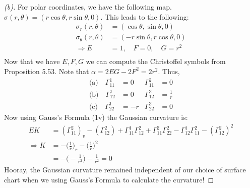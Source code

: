 \documentclass[a4paper, 11pt]{article}
\begin{document}
	\begin{proof}[(b)]
		For polar coordinates, we have the following map. $\sigma(r,\theta) =(r\cos\theta, r\sin\theta, 0)$. This leads to the following:
			\begin{align*}
				\sigma_r(r,\theta) &= (\cos\theta, \sin\theta, 0) \\ 
				\sigma_\theta(r,\theta) &= (-r\sin\theta, r\cos\theta, 0) \\ 
				\Rightarrow E&= 1, \quad F=0, \quad G=r^2 \\ 
			\end{align*}
		Now that we have $E,F,G$ we can compute the Christoffel symbols from Proposition 5.53. Note that $\alpha = 2EG-2F^2=2r^2$. Thus, 
			\begin{align*} 
				\text{(a)} \quad \Gamma_{11}^1 &= 0 &\Gamma_{11}^2 &= 0\\ 
				\text{(b)} \quad \Gamma_{12}^1 &= 0 &\Gamma_{12}^2 &= \frac{1}{r} \\
				\text{(c)} \quad \Gamma_{22}^1 &= -r &\Gamma_{22}^2 &= 0
			\end{align*}
		Now using Gauss's Formula (1v) the Gaussian curvature is:	
			\begin{align*}
				EK &= (\Gamma_{11}^2)_v - (\Gamma_{12}^2)+\Gamma_{11}^1\Gamma_{12}^2+\Gamma_{11}^2\Gamma_{22}^2-\Gamma_{12}^1\Gamma_{11}^2-(\Gamma_{12}^2)^2 \\ 
				\Rightarrow K&= -\Big(\frac{1}{r}\Big)_r -\Big(\frac{1}{r}\Big)^2 \\ 
					&= -\Big(-\frac{1}{r^2}\Big)-\frac{1}{r^2} = 0
			\end{align*}
		Hooray, the Gaussian curvature remained independent of our choice of surface chart when we using Gauss's Formula to calculate the curvature! 
	\end{proof}
	
	
	
\end{document}
